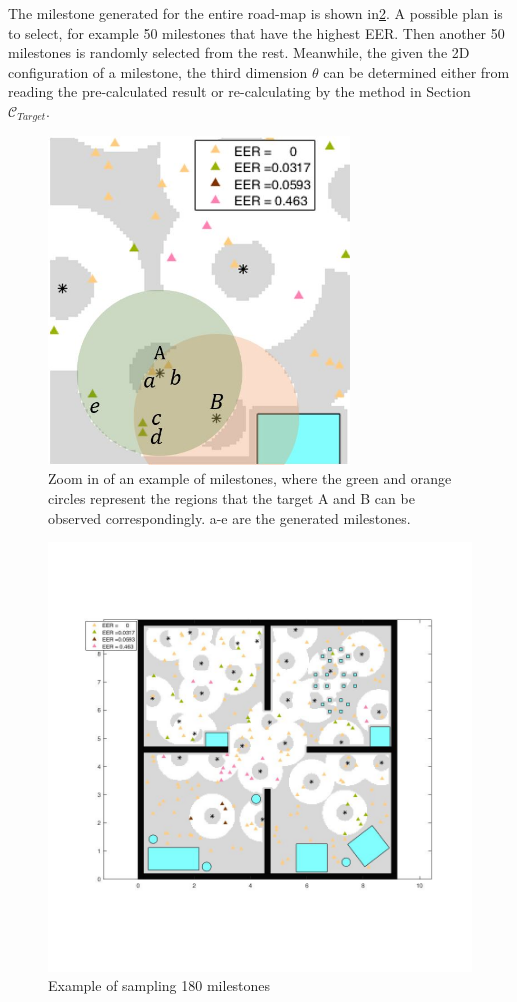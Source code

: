 \documentclass[12pt,draftcls,onecolumn]{IEEEtran}
\begin{document}
The milestone generated for the entire road-map is shown in\ref{fig:16}. 
A possible plan is to select, for example 50 milestones that have the highest EER. 
Then another 50 milestones is randomly selected from the rest. 
Meanwhile, the given the 2D configuration of a milestone, the third dimension $\theta$ can be determined either from reading the pre-calculated result or re-calculating by the method in Section $\mathcal{C}_{Target}$.


\begin{figure}
 \centering
  \includegraphics[width=8cm]{figures/EER_zoom}
  \caption{Zoom in of an example of milestones, where the green and orange circles represent the regions that the target A and B can be observed correspondingly. a-e are the generated milestones.}
  \label{fig:17}
\end{figure}


\begin{figure}
 \centering
  \includegraphics[width=20cm]{figures/milestone180}
  \caption{Example of sampling 180 milestones}
  \label{fig:16}
\end{figure}
\end{document}
